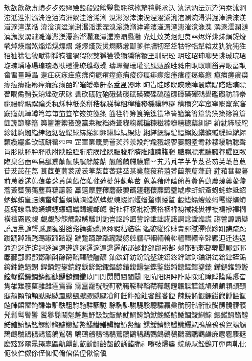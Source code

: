 㰦欯歊歘歬歵⺞歺殁殛殮𣪘殽毇毈毉毚毦毧毮氂氊氎氶𣱿
汍汛汭沄沉㳃沔沗沭泂㳒泜泩泭𣴀洀洤洦洧汧洯洼浛浠浰
涀涁涊涍涑涘𣵀𣷺𣷹𣷓涫涮涴淂洴淈淎淟淶渶渞㴑渲湈湉
湋湌湏湓湔湗湣㴞溓溧溴滃漵滫滹滻漊漌漘漥漶漼𣽾潒潗
潠潨澐澖澾澟澥澯㵤濈濉濩𤂖濼瀀瀊瀣𤄃瀺灃灇灋㶚灥灩
灮灶炆炗𤇆炟炱𤇾烬烊烑焃焆焈焌㷀焯煐煓煞㷔熖熀熛熠
熢熮熯𤎼燙燜爇㸅爴爹牂牗牣𤘩牮牯牸牿犎𤚥犮犰狁㹠狌
㹦㹨狳狺猇猒猘猙㺃猹猬猳猽獒㺔獫𤢖獮獯獱玁玊玔玘玜
玥玹玿珅珋珡珧珹琓珺琁瑓瑀瑃瑒瑝璁璈𤩍璒璗璙璡璥璪
璹璻璺瓖瓘瓫𤭖瓺𤭯甠甤甪㽗𤰖甽甾畀畈畐畒畲畱畺畽畾
疌㽵疢㽷疰疷疿痀痆痏痓痝痟痠痧痮痱瘃瘘瘇瘏㾮𤸎瘓瘛
瘜𤸷瘥瘨瘼瘳𤹪㿉癁𤺋癉癕㿗癮皕皡皠皧皨皯𥁊盉𥁕盨𥄢
眗眚眭眵𥆩䀹𥇥𥇍睘𥈞睼𥉌䁘瞚瞟瞢瞤矞矟矤矪矬矻𥐮砅
砉砍砙砬硇硪𥓙碊碔碤碝碟碻磕磦磹磺磾𥖧礐礛礥祊祘䄅
祧祲禕禡禩禴秂秇秌种秖䅈𥞩𥞴䅏稊稕稛䅣稸穇穖穙穜穟
穧穪穵窂窊窐窬𥧔䆴窹窾䆿竌竨竴𥫤𥫣𥫱笽笪笮笯䇦䇳筿
筁䇮筕筹筤筦筳𥮲䈇箐箛䈎箵箼篅篊𥱋𥱤篔篖篚篪篰簃簎
籅籊籗籞籡籩籯𥸮𥹖𥹥粦𥹢粶粷𥻘糄𥻂糍𥻨𥼣糦𥽜糵紃䋆
紒紞𥿠𥿔紽紾絀絇𦀌𥿻䋖絚絪絰䋝絿𦀗綈綗𦁠綝綧綪綶緀
緗緙緦䌂𦃭縉縐縗縝縧縬繅繵繾纆纇䌫纚䍃缼缻缾罃㓁𦉰
𦊆罣罤罭罽罾羐养𣴎羖羜羭𦐂翃翏翣翲耊耈耖耬耰聃聦聻
肙肜肤肧肸𦙾胅胕胦脍胵胻䏮脵脞䏰脤脧脬𦜝脽䐈腩䐗䐜
膅䐢膘膲臁臃臖臛𦣝臤𦣪臬臽臿𦥯舄𦧝舙舢𦨞舼艉艅𦩘䑶
䑺艗𦪌艜艣𦪷䒑艽艿芃芊芓芧芨芲芴芺芼苢苨苷茇茈茌荔
茛茝茰茼荄荗䒾䓔䒳莔莕莛莝菉菐菔菝菥菹萕𦱳萗萹葏葑
葒葙葚葜𦳝葥葸葼蒁䔍蒗蒦蒾䔈蓎蓏蓓𦹥蓧蓪蓯蓱蓺蔛蔤
蔥蔫蕏蕯䕃蕑蕡蕢𦾔蕻蕽蕿薁薆薓薝薟𦿸𦿶𦿷薼藇藊藘藙
藟藡藦藶蘀蘑蘞蘡蘤蘧𧄍蘹蘼𧄹虀虓虖虷蚇蚉蚜蚝蚱蚳蛁
蛃蛑蛕蛗蛣蛦䖸蜅蜇蜎蜐蜟蜡蜣蜱蜺蝀蝃蝑蝘蝤蝥蝲蝼𧏛
𧏚螧螉螋螓螠𧏾䗥螾𧐐蟁蟎蟟𧑉蟣蟥蟦蟪蠓蠨蠮蠲蠼䘏衊
衘𧘕𧘔衩𧘱衯袠袼裀𧚓裑裓䙁褁𧜎褷𧜣襂襅襉𧝒襢覉覐覟
覰覷觘觫䚡觳觽觿䚯訑訔𧦅訡訵訾詅詍詘誮誐誷諗諼𧪄謊
謅謍謜謭䜌譑譞譶讁讋讔讕谹𧮳谽𧮾𧯇豅豏豗豩豭𧲸貓貒
貙䝤貛賖賕𧶠賱𧸐贉贎跈跙踌䟽跽踆𨂊踔踖踡踢踧𨂻䠖踶
踹蹔蹢蹭蹯躘躞躵躻𨊂䡎𨋳輀輈輫轀轊轘𨐌辤辴𨑕迁迆﨤
迊迍迓迕迱迵迻逌逷𨕫遃遝𨗈𨗉邅邌邐邡䢵邰邶郃郈𨛗郜
郟𨛺郶郲鄀郫郾郿鄄鄆鄘鄞鄷鄹酆酇酗酙酴酹醅醳醶釃釄
𨥉𨥆釬鈁鈖鈗𨥫鉂鉊鉖鉡鉥鉨𨦈鉼鉽鉿銉銍銗銙銟銫𨦺𨦻
銲銿鋀鋆鋎鋥錑𨨞𨨩鋷錩𨩱𨩃鍑鍚鍫鍱鍳鎡𨪙𨫍鎈鎋鎏鎞
鏵𨫤𨫝鏱鏇鏜鏧鐉鐖鐗鏻鐲鐻𨯁𨯯鑭鑯镹閆閌閍𨴐𨵱闈𨷻
𨸟阬阳阴𨸶阼陡𨺉隂𨻫隚𨼲䧧隳隺隽䧺𨿸雘雚雝䨄霔霣䨩
霶靁靇靗靛靪𩊠𩊱鞖鞞鞱鞲鞾韌韑韔韘韡韱頄頍頔頖䪼𩒐
頲頳頥顇顦颫颭颰𩗏颷颻颼飂飇飋飡飣飪飰飱飳餈䬻𩛰餖
餗𩜙餚餛餜𩝐餱餺餻餼饁饆饎饠馣馦馽馿駃駔駙駞𩣆駰駹
駼騊騑騚騠騱驄驌驘䯂骯䯊骷䯒骹𩩲髆髐髒髕髠髥髩鬌鬐
鬒鬖鬜鬫鬽䰠魋魣魥魫魬魶魷鮦鮬𩷛鮲鮸鮾鯳鯘鯝鯪鯯鯮
𩸕𩺊𩹉鰖鰘鰙鰚鰝鰢鰩𩻄鰱鰷鱅鱜𩻩鱉鱊𩻛鱔鱘鱛鱝鱟鱩
鱪鱫鱭鱮鱲鱵鱺鳦鳲鴋𩿎𩿗鴑鴗鴘𪀯䳄𪀚鴲䳑鵊鵟鵢𪃹𪂂
鵳鵶鵷鶄鶙鶡鶿鶵鶹鶽鷉鷚鷠鷣䴇鸊鸂鸍鸜鹻𢈘麀麅麛𪎌
麽𪐷黟黿鼂䵷鼃鼺鼽齆齓齕齘𪗱齝𪘂齩齭齰𪚲⺬㘔㢭㷌㿜
䖾䘐䭾䰸䳡丌丣两乹仳伌伙伫伮伱侄侞侷倄倌偌偟偢偷傎
